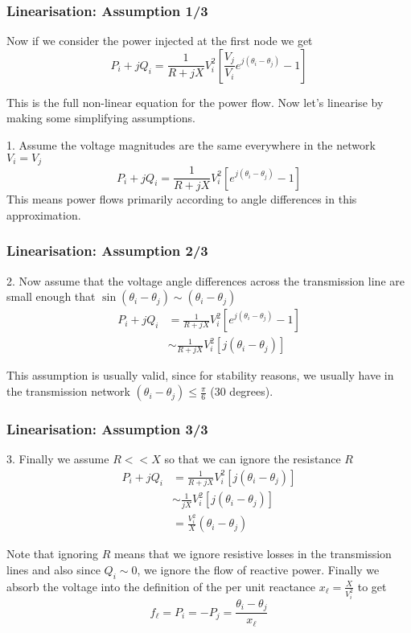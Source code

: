 \documentclass[10pt,dvipsnames]{beamer}
\begin{document}
\begin{frame}
  \frametitle{Linearisation: Assumption 1/3}

  Now if we consider the power injected at the first node we get
  \begin{equation*}
    P_i + jQ_i =  \frac{1}{R + jX} V_i^2\left[\frac{V_j}{V_i} e^{j(\theta_i - \theta_j)} - 1\right]
  \end{equation*}

  This is the full non-linear equation for the power flow. Now let's
  linearise by making some simplifying assumptions.

  1. Assume the voltage magnitudes are the same everywhere in the network $V_i = V_j$
  \begin{equation*}
    P_i + jQ_i =  \frac{1}{R + jX} V_i^2\left[e^{j(\theta_i - \theta_j)} - 1\right]
  \end{equation*}
  This means \alert{power flows primarily according to angle differences} in this approximation.


\end{frame}




\begin{frame}
  \frametitle{Linearisation: Assumption 2/3}


  2. Now assume that the voltage angle differences across the transmission line are small enough that $\sin(\theta_i - \theta_j) \sim (\theta_i - \theta_j)$
  \begin{align*}
    P_i + jQ_i & =  \frac{1}{R + jX} V_i^2\left[e^{j(\theta_i - \theta_j)} - 1\right] \\
    & \sim  \frac{1}{R + jX} V_i^2\left[j(\theta_i - \theta_j)\right]
  \end{align*}

  This assumption is usually valid, since for stability reasons, we usually have in the transmission network
  $(\theta_i - \theta_j) \leq \frac{\pi}{6}$ (30 degrees).
\end{frame}



\begin{frame}
  \frametitle{Linearisation: Assumption 3/3}


  3. Finally we assume $R << X$ so that we can ignore the resistance $R$
  \begin{align*}
    P_i + jQ_i
    & =  \frac{1}{R + jX} V_i^2\left[j(\theta_i - \theta_j)\right] \\
    & \sim  \frac{1}{jX} V_i^2\left[j(\theta_i - \theta_j)\right]\\
    & =  \frac{V_i^2}{X}(\theta_i - \theta_j)
  \end{align*}

  Note that ignoring $R$ means that we ignore resistive losses in the transmission lines and also since $Q_i \sim 0$, we ignore the flow of reactive power. Finally we absorb the voltage into the definition of the \alert{per unit} reactance $x_\ell = \frac{X}{V_i^2}$ to get
  \begin{equation*}
    f_\ell = P_i = -P_j = \frac{\theta_i - \theta_j}{x_\ell}
  \end{equation*}

\end{frame}
\end{document}
